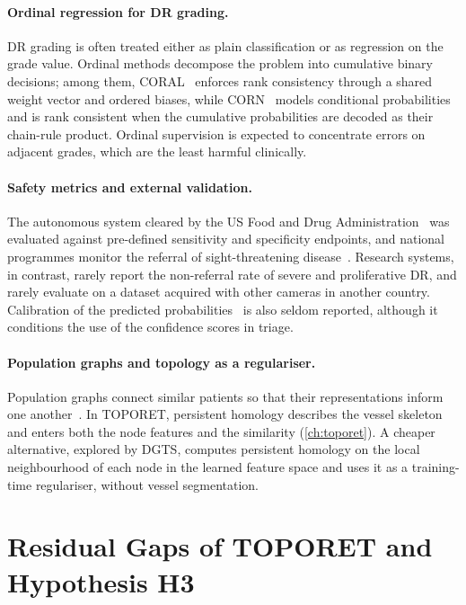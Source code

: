 \paragraph{Ordinal regression for DR grading.}
DR grading is often treated either as plain classification or as regression on the grade
value. Ordinal methods decompose the problem into cumulative binary decisions; among them,
CORAL~\cite{cao2020coral} enforces rank consistency through a shared weight vector and
ordered biases, while CORN~\cite{shi2023corn} models conditional probabilities and is rank
consistent when the cumulative probabilities are decoded as their chain-rule product.
Ordinal supervision is expected to concentrate errors on adjacent grades, which are the
least harmful clinically.

\paragraph{Safety metrics and external validation.}
The autonomous system cleared by the US Food and Drug Administration~\cite{abramoff2018pivotal}
was evaluated against pre-defined sensitivity and specificity endpoints, and national
programmes monitor the referral of sight-threatening disease~\cite{scanlon2017english}.
Research systems, in contrast, rarely report the non-referral rate of severe and
proliferative DR, and rarely evaluate on a dataset acquired with other cameras in another
country. Calibration of the predicted probabilities~\cite{guo2017calibration} is also
seldom reported, although it conditions the use of the confidence scores in triage.

\paragraph{Population graphs and topology as a regulariser.}
Population graphs connect similar patients so that their representations inform one
another~\cite{parisot2018disease,hamilton2017graphsage}. In TOPORET, persistent homology
describes the vessel skeleton and enters both the node features and the similarity
(\cref{ch:toporet}). A cheaper alternative, explored by DGTS, computes persistent homology
on the local neighbourhood of each node in the learned feature space and uses it as a
training-time regulariser, without vessel segmentation.

\section{Residual Gaps of TOPORET and Hypothesis H3}
\label{sec:ch4-motivation}\label{sec:ch4-gaps}

